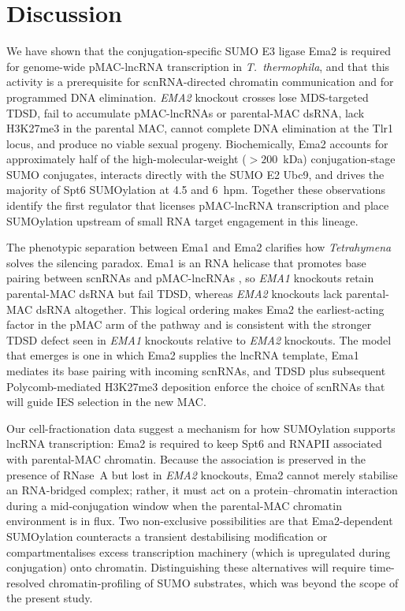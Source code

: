 \documentclass[11pt]{article}
\begin{document}
\section{Discussion}

We have shown that the conjugation-specific SUMO E3 ligase Ema2 is
required for genome-wide pMAC-lncRNA transcription in
\emph{T.~thermophila}, and that this activity is a prerequisite for
scnRNA-directed chromatin communication and for programmed DNA
elimination. \emph{EMA2} knockout crosses lose MDS-targeted TDSD, fail
to accumulate pMAC-lncRNAs or parental-MAC dsRNA, lack H3K27me3 in the
parental MAC, cannot complete DNA elimination at the Tlr1 locus, and
produce no viable sexual progeny. Biochemically, Ema2 accounts for
approximately half of the high-molecular-weight ($>\!200$~kDa)
conjugation-stage SUMO conjugates, interacts directly with the SUMO E2
Ubc9, and drives the majority of Spt6 SUMOylation at 4.5 and 6~hpm.
Together these observations identify the first regulator that licenses
pMAC-lncRNA transcription and place SUMOylation upstream of small RNA
target engagement in this lineage.

The phenotypic separation between Ema1 and Ema2 clarifies how
\emph{Tetrahymena} solves the silencing paradox. Ema1 is an RNA helicase
that promotes base pairing between scnRNAs and pMAC-lncRNAs
\citep{aronica2008ema1}, so \emph{EMA1} knockouts retain parental-MAC
dsRNA but fail TDSD, whereas \emph{EMA2} knockouts lack parental-MAC
dsRNA altogether. This logical ordering makes Ema2 the earliest-acting
factor in the pMAC arm of the pathway and is consistent with the
stronger TDSD defect seen in \emph{EMA1} knockouts relative to
\emph{EMA2} knockouts. The model that emerges is one in which Ema2
supplies the lncRNA template, Ema1 mediates its base pairing with
incoming scnRNAs, and TDSD plus subsequent Polycomb-mediated H3K27me3
deposition \citep{liu2004h3k9,liu2007rnai,frapporti2019ezl1} enforce
the choice of scnRNAs that will guide IES selection in the new MAC.

Our cell-fractionation data suggest a mechanism for how SUMOylation
supports lncRNA transcription: Ema2 is required to keep Spt6 and RNAPII
associated with parental-MAC chromatin. Because the association is
preserved in the presence of RNase~A but lost in \emph{EMA2}
knockouts, Ema2 cannot merely stabilise an RNA-bridged complex; rather,
it must act on a protein--chromatin interaction during a mid-conjugation
window when the parental-MAC chromatin environment is in flux. Two
non-exclusive possibilities are that Ema2-dependent SUMOylation
counteracts a transient destabilising modification or compartmentalises
excess transcription machinery (which is upregulated during conjugation)
onto chromatin. Distinguishing these alternatives will require
time-resolved chromatin-profiling of SUMO substrates, which was beyond
the scope of the present study.
\end{document}
